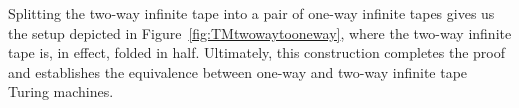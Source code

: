 Splitting the two-way infinite tape into a pair of one-way infinite tapes gives us the setup depicted in Figure~\ref{fig:TMtwowaytooneway}, where the two-way infinite tape is, in effect, folded in half. Ultimately, this construction completes the proof and establishes the equivalence between one-way and two-way infinite tape Turing machines.

